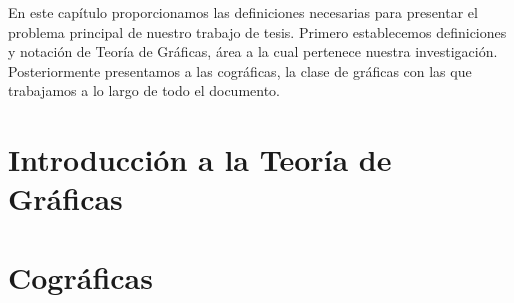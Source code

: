 En este capítulo proporcionamos las definiciones necesarias para presentar el problema principal de nuestro trabajo de tesis. Primero establecemos definiciones y notación de Teoría de Gráficas, área a la cual pertenece nuestra investigación. Posteriormente presentamos a las cográficas, la clase de gráficas con las que trabajamos a lo largo de todo el documento.


\section{Introducción a la Teoría de Gráficas}
    


\section{Cográficas}
    

